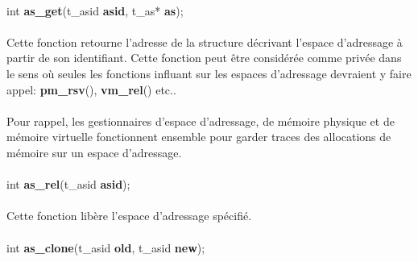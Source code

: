 \documentclass[10pt,a4wide]{article}
\begin{document}
\paragraph{}

\hspace{1.5cm}int \textbf{as\_get}(t\_asid \textbf{asid},
                                   t\_as* \textbf{as});

\paragraph{}

Cette fonction retourne l'adresse de la structure d\'ecrivant l'espace
d'adressage \`a partir de son identifiant. Cette fonction peut \^etre
consid\'er\'ee comme priv\'ee dans le sens o\`u seules les fonctions
influant sur les espaces d'adressage devraient y faire appel:
\textbf{pm\_rsv}(), \textbf{vm\_rel}() etc..

\paragraph{}

Pour rappel, les gestionnaires d'espace d'adressage, de m\'emoire physique
et de m\'emoire virtuelle fonctionnent ensemble pour garder traces des
allocations de m\'emoire sur un espace d'adressage.

\paragraph{}

\hspace{1.5cm}int \textbf{as\_rel}(t\_asid \textbf{asid});

\paragraph{}

Cette fonction lib\`ere l'espace d'adressage sp\'ecifi\'e.

\paragraph{}

\hspace{1.5cm}int \textbf{as\_clone}(t\_asid \textbf{old},
                                     t\_asid \textbf{new});

\paragraph{}
\end{document}
